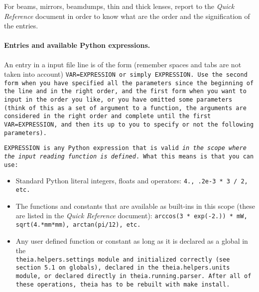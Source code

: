 \documentclass{article}
\begin{document}
For beams, mirrors, beamdumps, thin and thick lenses, report to the \textit{Quick Reference} document in order to know what are the order and the signification of the entries.

\paragraph{Entries and available Python expressions.}An entry in a input file line is of the form (remember spaces and tabs are not taken into account) \tt{VAR=EXPRESSION} or simply \tt{EXPRESSION}. Use the second form when you have specified all the parameters since the beginning of the line and in the right order, and the first form when you want to input in the order you like, or you have omitted some parameters (think of this as a set of argument to a function, the arguments are considered in the right order and complete until the first \tt{VAR=EXPRESSION}, and then its up to you to specify or not the following parameters).

\tt{EXPRESSION} is any Python expression that is valid \textit{in the scope where the input reading function is defined}. What this means is that you can use:
\begin{itemize}
\item Standard Python literal integers, floats and operators: \tt{4.}, \tt{.2e-3 * 3 / 2}, etc.
\item The functions and constants that are available as built-ins in this scope (these are listed in the \textit{Quick Reference} document): \tt{arccos(3 * exp(-2.)) * mW}, \tt{sqrt(4.*mm*mm)}, \tt{arctan(pi/12)}, etc.
\item Any user defined function or constant as long as it is declared as a global in the \\ \tt{theia.helpers.settings} module and initialized correctly (see section 5.1 on globals), declared in the \tt{theia.helpers.units} module, or declared directly in \tt{theia.running.parser}. After all of these operations, \tt{theia} has to be rebuilt with \tt{make install}.
\end{itemize}




\end{document}
